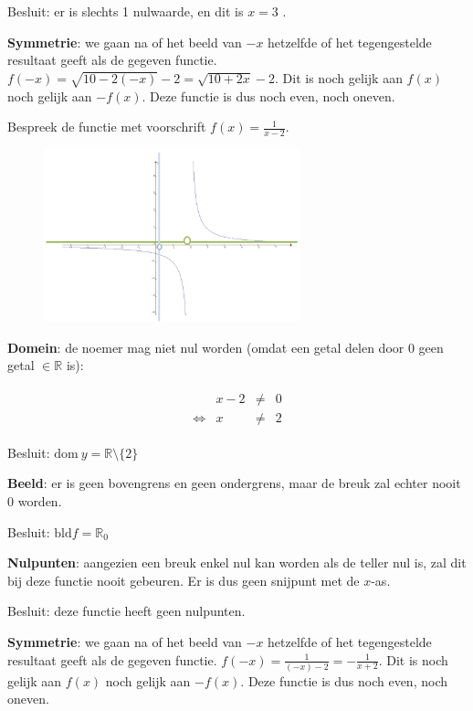 \begin{voorbeeld}
Besluit: er is slechts 1 nulwaarde, en dit is $x=3$ .




\textbf{Symmetrie}: we gaan na of het beeld van $-x$ hetzelfde
of het tegengestelde resultaat geeft als de gegeven functie. $f(-x)=\sqrt{10-2(-x)}-2=\sqrt{10+2x}-2$.
Dit is noch gelijk aan $f(x)$ noch gelijk aan $-f(x)$. Deze functie
is dus noch even, noch oneven.

\end{voorbeeld}

\begin{voorbeeld}
	Bespreek de functie met voorschrift $f(x)=\frac{1}{x-2}$.

\begin{figure}[h]
	\centering{}\includegraphics[height=5cm]{2_elem_rekenvaardigheden_B/inputs/reeel_vb2.jpg} 
\end{figure}


\textbf{Domein}: de noemer mag niet nul worden (omdat een
getal delen door $0$ geen getal $\in \mathbb{R}$ is):


\begin{eqnarray*}
	\begin{array}{cccc}
		& x-2 & \neq & 0\\
		\iff & x & \neq & 2
	\end{array}
\end{eqnarray*}


Besluit: $\textrm{dom}\:y=\mathbb{R}\setminus\{2\}$ 




\textbf{Beeld}: er is geen bovengrens en geen ondergrens,
maar de breuk zal echter nooit $0$ worden.

Besluit: $\textrm{bld}f=\mathbb{R}_{0}$




\textbf{Nulpunten}: aangezien een breuk enkel nul kan worden
als de teller nul is, zal dit bij deze functie nooit gebeuren. Er
is dus geen snijpunt met de $x$-as.

Besluit: deze functie heeft geen nulpunten.




\textbf{Symmetrie}: we gaan na of het beeld van $-x$ hetzelfde
of het tegengestelde resultaat geeft als de gegeven functie. $f(-x)=\frac{1}{(-x)-2}=-\frac{1}{x+2}$.
Dit is noch gelijk aan $f(x)$ noch gelijk aan $-f(x)$. Deze functie
is dus noch even, noch oneven.

\end{voorbeeld}

